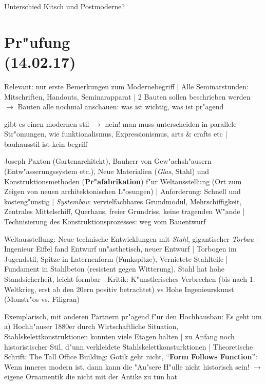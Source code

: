 \documentclass[a5paper]{scrartcl}
\begin{document}
Unterschied Kitsch und Postmoderne?

\section{Pr"ufung\\(14.02.17)}

Relevant: nur erste Bemerkungen zum Modernebegriff | 
Alle Seminarstunden: Mitschriften, Handouts, Seminarapparat | 
2 Bauten sollen beschrieben werden $\rightarrow$ Bauten alle nochmal anschauen: was ist wichtig, was ist pr"agend 

\begin{description}[leftmargin=!,labelwidth=\widthof{\bfseries P1}]
  \item[Baubeschreibung] 
  \item[Modernebegriff] gibt es einen modernen stil $\rightarrow$ nein! man muss unterscheiden in parallele Str"omungen, wie funktionalismus, Expressionismus, arts \& crafts etc | bauhausstil ist kein begriff
  \item[Crystal Palace] Joseph Paxton (Gartenarchitekt), Bauherr von Gew"achsh"ausern (Entw"asserungssystem etc.), Neue Materialien (\emph{Glas}, Stahl) und Konstruktionsmethoden (\textbf{Pr"afabrikation}) f"ur Weltausstellung (Ort zum Zeigen von neuen architektonischen L"osungen) | Anforderung: Schnell und kosteng"unstig | \emph{Systembau}: vervielfachbares Grundmodul, Mehrschiffigkeit, Zentrales Mittelschiff, Querhaus, freier Grundriss, keine tragenden W"ande | Technisierung des Konstruktionsprozesses: weg vom Bauentwurf
  \item[Eiffelturm] Weltausstellung: Neue technische Entwicklungen mit \emph{Stahl}, gigantischer \emph{Torbau} | Ingenieur Eiffel fand Entwurf un"asthetisch, neuer Entwurf | Torbogen im Jugendstil, Spitze in Laternenform (Funkspitze), Vernietete Stahlteile | Fundament in Stahlbeton (resistent gegen Witterung), Stahl hat hohe Standsicherheit, leicht formbar | Kritik: K"unstlerisches Verbrechen (bis nach 1. Weltkrieg, erst ab den 20ern positiv betrachtet) vs Hohe Ingenieurskunst (Monstr"os vs. Filigran)
  \item[Louis Sullivan] Exemplarisch, mit anderen Partnern pr"agend f"ur den Hochhausbau: Es geht um a) Hochh"auser 1880er durch Wirtschaftliche Situation, Stahlskelettkonstruktionen konnten viele Etagen halten | zu Anfang noch historistischer Stil, d"unn verkleidete Stahlskelettkonsturktionen | Theoretische Schrift: The Tall Office Building: Gotik geht nicht, "`\textbf{Form Follows Function}"': Wenn inneres modern ist, dann kann die "Au"sere H"ulle nicht historisch sein! $\rightarrow$ eigene Ornamentik die nicht mit der Antike zu tun hat

\end{description}
\end{document}
